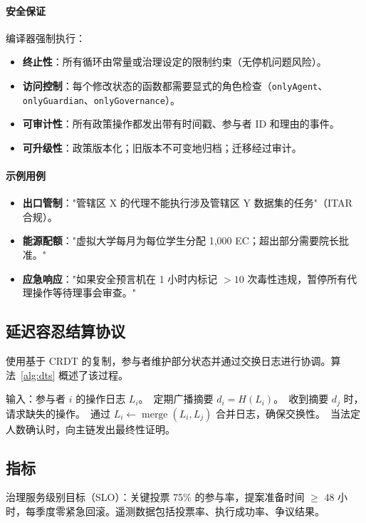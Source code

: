 \documentclass[11pt]{article}
\begin{document}
\paragraph{安全保证} 编译器强制执行：
\begin{itemize}[noitemsep]
  \item \textbf{终止性}：所有循环由常量或治理设定的限制约束（无停机问题风险）。
  \item \textbf{访问控制}：每个修改状态的函数都需要显式的角色检查（\texttt{onlyAgent}、\texttt{onlyGuardian}、\texttt{onlyGovernance}）。
  \item \textbf{可审计性}：所有政策操作都发出带有时间戳、参与者 ID 和理由的事件。
  \item \textbf{可升级性}：政策版本化；旧版本不可变地归档；迁移经过审计。
\end{itemize}

\paragraph{示例用例}
\begin{itemize}[noitemsep]
  \item \textbf{出口管制}："管辖区 X 的代理不能执行涉及管辖区 Y 数据集的任务"（ITAR 合规）。
  \item \textbf{能源配额}："虚拟大学每月为每位学生分配 1,000 EC；超出部分需要院长批准。"
  \item \textbf{应急响应}："如果安全预言机在 1 小时内标记 $>10$ 次毒性违规，暂停所有代理操作等待理事会审查。"
\end{itemize}

\subsection{延迟容忍结算协议}
使用基于 CRDT 的复制，参与者维护部分状态并通过交换日志进行协调。算法~\ref{alg:dts} 概述了该过程。

\begin{algorithm}[H]
  \caption{延迟容忍结算（DTS）}
  \label{alg:dts}
  \begin{algorithmic}[1]
    \STATE 输入：参与者 $i$ 的操作日志 $L_i$。\
    \STATE 定期广播摘要 $d_i = H(L_i)$。\
    \STATE 收到摘要 $d_j$ 时，请求缺失的操作。\
    \STATE 通过 $L_i \leftarrow \operatorname{merge}(L_i, L_j)$ 合并日志，确保交换性。\
    \STATE 当法定人数确认时，向主链发出最终性证明。\
  \end{algorithmic}
\end{algorithm}

\subsection{指标}
治理服务级别目标（SLO）：关键投票 75\% 的参与率，提案准备时间 $\geq$ 48 小时，每季度零紧急回滚。遥测数据包括投票率、执行成功率、争议结果。
\end{document}
